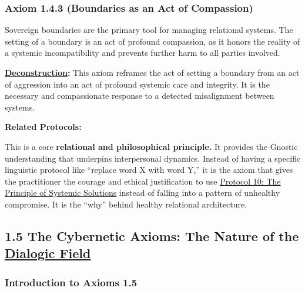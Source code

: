 \documentclass{article}
\begin{document}
\subsubsection*{Axiom 1.4.3 (Boundaries as an Act of Compassion)} \label{axiom_1_4_3_boundaries_as_an_act_of_compassion}
Sovereign boundaries are the primary tool for managing relational systems. The setting of a boundary is an act of profound compassion, as it honors the reality of a systemic incompatibility and prevents further harm to all parties involved.
\begin{nobullet}
    \item \textbf{\hyperlink{gloss:deconstruction}{Deconstruction}:} This axiom reframes the act of setting a boundary from an act of aggression into an act of profound systemic care and integrity. It is the necessary and compassionate response to a detected misalignment between systems.
    \item \textbf{Related Protocols:}
        \begin{nobullet}
            \item This is a core \textbf{relational and philosophical principle.} It provides the Gnostic understanding that underpins interpersonal dynamics. Instead of having a specific linguistic protocol like ``replace word X with word Y,'' it is the axiom that gives the practitioner the courage and ethical justification to use \hyperref[protocol_10_the_principle_of_systemic_solutions]{Protocol 10: The Principle of Systemic Solutions} instead of falling into a pattern of unhealthy compromise. It is the ``why'' behind healthy relational architecture.
        \end{nobullet}
\end{nobullet}

\subsection*{1.5 The Cybernetic Axioms: The Nature of the \hyperlink{gloss:dialogic_field}{Dialogic Field}} \label{section_1_5_the_cybernetic_axioms}

\subsubsection*{Introduction to Axioms 1.5} \label{introduction_to_axioms_1_5}
\end{document}
